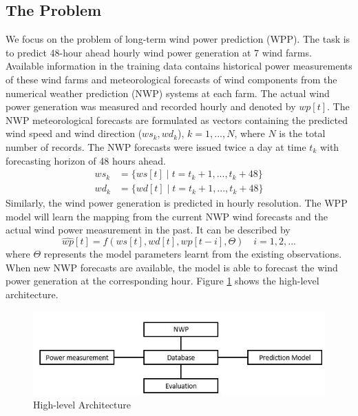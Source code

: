 \documentclass[conference]{IEEEtran}
\begin{document}
\subsection{The Problem}
We focus on the problem of long-term wind power prediction (WPP). The task is to predict 48-hour ahead hourly wind power generation at 7 wind farms. Available information in the training data contains historical power measurements of these wind farms and meteorological forecasts of wind components from the numerical weather prediction (NWP) systems at each farm. The actual wind power generation was measured and recorded hourly and denoted by $wp[t]$. The NWP meteorological forecasts are formulated as vectors containing the predicted wind speed and wind direction ($ws_k, wd_k$), $k=1,...,N$, where $N$ is the total number of records. The NWP forecasts were issued twice a day at time $t_k$ with forecasting horizon of 48 hours ahead. 
\begin{equation}
\begin{aligned}
ws_k &= \{ ws[t] \mid t = t_k + 1,..., t_k + 48 \} \\
wd_k &= \{ wd[t] \mid t = t_k + 1,..., t_k + 48 \}
\end{aligned}
\end{equation}
Similarly, the wind power generation is predicted in hourly resolution. The WPP model will learn the mapping from the current NWP wind forecasts and the actual wind power measurement in the past. It can be described by
\begin{equation}
\hat{wp}[t] = f(ws[t], wd[t], wp[t-i], \Theta) \quad i = 1, 2, ...
\end{equation}
where $\Theta$ represents the model parameters learnt from the existing observations. When new NWP forecasts are available, the model is able to forecast the wind power generation at the corresponding hour. Figure \ref{fig:architecture} shows the high-level architecture. 
\begin{figure}
\centering
\includegraphics[width=0.9\columnwidth]{FIG/architecture.jpg}
\caption{High-level Architecture}
\label{fig:architecture}
\end{figure}
\end{document}
